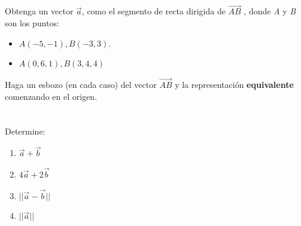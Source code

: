 \documentclass[12pt]{article}
\begin{document}
\section{}
Obtenga un vector $\vec{a}$, como el segmento de recta dirigida de $\vec{AB}$ , donde \textit{A} y \textit{B} son los puntos:

\begin{itemize}
  
\item $A(-5,-1) , B(-3,3)$.
  
\item $A(0,6,1), B(3,4,4)$
  
\end{itemize}

Haga un esbozo (en cada caso) del vector $\vec{AB}$ y la representación \textbf{equivalente} comenzando en el origen.

\section{}

Determine:

\begin{enumerate}
  
\item $\vec{a} + \vec{b}$
  
\item $4 \vec{a} + 2\vec{b}$

\item $||\vec{a} - \vec{b}||$

\item $||\vec{a}||$

\end{enumerate}
\end{document}
